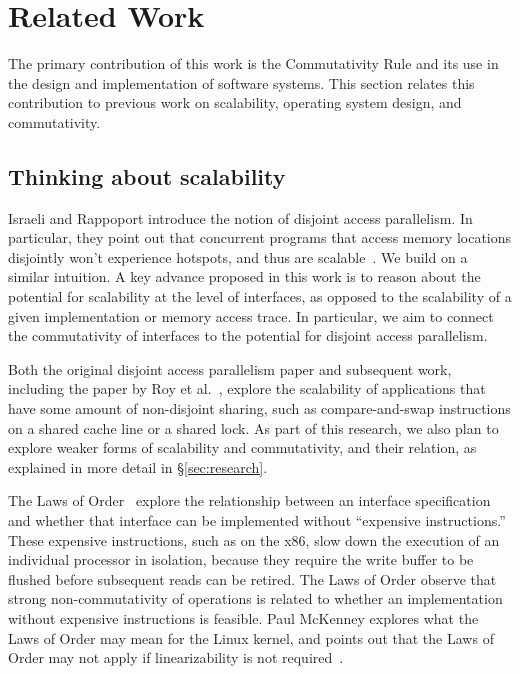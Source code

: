 
\section{Related Work}
\label{sec:related}

The primary contribution of this work is the Commutativity Rule and its
use in the design and implementation of software systems.  This section
relates this contribution to previous work on scalability, operating
system design, and commutativity.

\subsection{Thinking about scalability}

Israeli and Rappoport introduce the notion of disjoint access parallelism.
In particular, they point out that concurrent programs that access
memory locations disjointly won't experience hotspots, and thus 
are scalable~\cite{israeli:disjoint-access}.  We build on a similar intuition.
A key advance proposed in this work is to reason about the potential
for scalability at the level of interfaces, as opposed to the
scalability of a given implementation or memory access trace.
In particular, we aim to connect the commutativity of interfaces to the
potential for disjoint access parallelism.

Both the original disjoint access parallelism paper and subsequent work,
including the paper by Roy et al.~\cite{roy:limits-dap}, explore
the scalability of applications that have some amount of non-disjoint
sharing, such as compare-and-swap instructions on a shared cache line
or a shared lock.  As part of this research, we also plan to explore
weaker forms of scalability and commutativity, and their relation,
as explained in more detail in \S\ref{sec:research}.

The Laws of Order~\cite{law:orders} explore the relationship between an
interface specification and whether that interface can be implemented
without ``expensive instructions.''  These expensive instructions, such
as  on the x86, slow down the execution of an individual
processor in isolation, because they require the write buffer to be
flushed before subsequent reads can be retired.  The Laws of Order observe
that strong non-commutativity of operations is related to whether an
implementation without expensive instructions is feasible.  Paul
McKenney explores what the Laws of Order may mean for the Linux kernel,
and points out that the Laws of Order may not apply if linearizability
is not required~\cite{lwn:law}.

